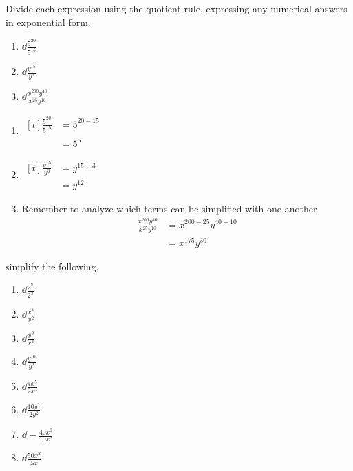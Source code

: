 \begin{myexample}
Divide each \gls{expression} using the quotient rule, expressing any numerical answers in exponential form.
\begin{multicols}{3}
	\begin{enumerate}
		\item $\dd\frac{5^{20}}{5^{15}}$
		\item $\dd\frac{y^{15}}{y^3}$
		\item $\dd\frac{x^{200}y^{40}}{x^{25}y^{10}}$
	\end{enumerate} 
\end{multicols}
\end{myexample}
\begin{myProof}
	\begin{enumerate}
		\item 
		$\begin{aligned}[t]
			\frac{5^{20}}{5^{15}} & =		5^{20-15} \\
			                      & =		5^5       
		\end{aligned} $
		\item 
		$\begin{aligned}[t]
			\frac{y^{15}}{y^3} & =		y^{15-3} \\
			                   & =		y^{12}   
		\end{aligned}$ 
		\item Remember to analyze which terms can be simplified with one another
		\begin{align*}
			\frac{x^{200}y^{40}}{x^{25}y^{10}} & =		x^{200-25}y^{40-10} \\
			                                   & =		x^{175}y^{30}       
		\end{align*} 
	\end{enumerate} 
\end{myProof} 

\begin{myexample}
\Gls{simplify} the following.
\drillandskill
\end{myexample}
\begin{multicols}{4}
	\begin{enumerate}
		\item $\dd\frac{2^8}{2^3}$
		\item $\dd\frac{x^4}{x^2}$
		\item $\dd\frac{x^9}{x^3}$
		\item $\dd\frac{y^{10}}{y^{2}}$
		\item $\dd \frac{4x^5}{2x^3}$
		\item $\dd \frac{10y^7}{2y^2}$
		\item $\dd -\frac{40x^9}{10x^2}$
		\item $\dd \frac{50x^2}{5x}$
	\end{enumerate}
\end{multicols}

